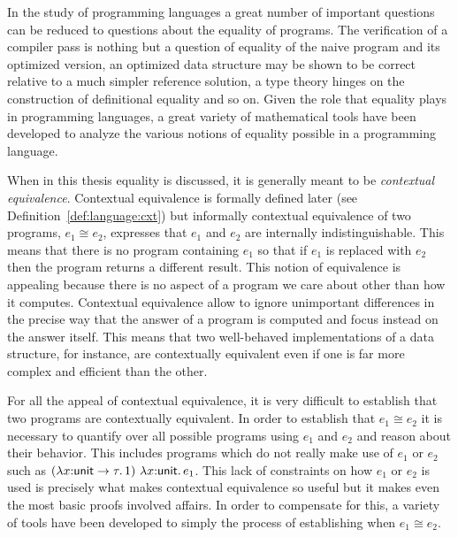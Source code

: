 In the study of programming languages a great number of important
questions can be reduced to questions about the equality of
programs. The verification of a compiler pass is nothing but a
question of equality of the naive program and its optimized version,
an optimized data structure may be shown to be correct relative to a
much simpler reference solution,
a type theory hinges on the
construction of definitional equality and so on. Given the role that
equality plays in programming languages, a great variety of
mathematical tools have been developed to analyze the various notions
of equality possible in a programming language.

When in this thesis equality is discussed, it is generally meant to be
\emph{contextual equivalence}. Contextual equivalence is formally
defined later (see Definition~\ref{def:language:cxt}) but informally
contextual equivalence of two programs, $e_1 \cong e_2$, expresses
that $e_1$ and $e_2$ are internally indistinguishable. This means that
there is no program containing $e_1$ so that if $e_1$ is replaced with
$e_2$ then the program returns a different result. This notion of
equivalence is appealing because there is no aspect of a program we
care about other than how it computes.
Contextual equivalence allow to
ignore unimportant differences in the precise way that the answer of a
program is computed and focus instead on the answer itself. This means
that two well-behaved implementations of a data structure, for
instance, are contextually equivalent even if one is far more complex
and efficient than the other.


For all the appeal of contextual equivalence, it is very difficult to
establish that two programs are contextually equivalent. In order to
establish that $e_1 \cong e_2$ it is necessary to quantify over all possible
programs using $e_1$ and $e_2$ and reason about their behavior. This
includes programs which do not really make use of $e_1$ or $e_2$ such
as $(\lambda x {:} \mathsf{unit} \to \tau.\, 1)\ \lambda x {:} \mathsf{unit}.\, e_1$. This
lack of constraints on how $e_1$ or $e_2$ is used is precisely what
makes contextual equivalence so useful but it makes even the most
basic proofs involved affairs.
In order to compensate for this, a
variety of tools have been developed to simply the process of
establishing when $e_1 \cong e_2$.

